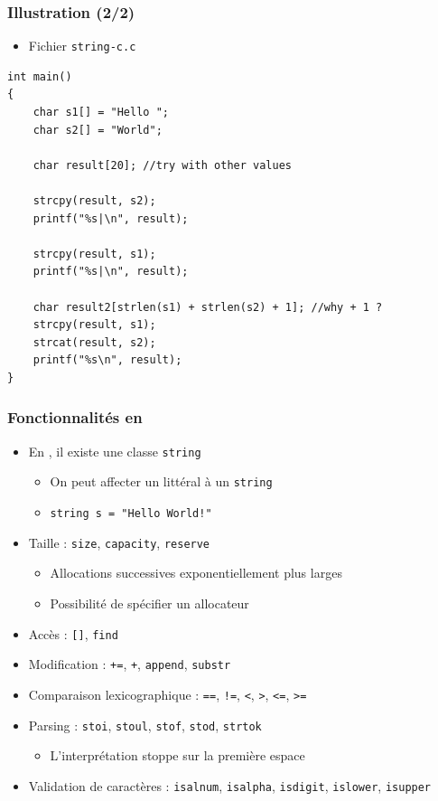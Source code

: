 \begin{frame}[containsverbatim]
\frametitle{Illustration (2/2)}
\begin{itemize}
\item Fichier \texttt{string-c.c}
\end{itemize}
\begin{lstlisting}
int main()
{
	char s1[] = "Hello ";
	char s2[] = "World";

	char result[20]; //try with other values

	strcpy(result, s2);	
	printf("%s|\n", result);

	strcpy(result, s1);
	printf("%s|\n", result);

	char result2[strlen(s1) + strlen(s2) + 1]; //why + 1 ?
	strcpy(result, s1);
	strcat(result, s2);
	printf("%s\n", result);	
}
\end{lstlisting}
\end{frame}

\begin{frame}
\frametitle{Fonctionnalités en \cpp}
\begin{itemize}[<+->]
\item En \cpp, il existe une classe \texttt{string}
	\begin{itemize}
	\item On peut affecter un littéral à un \texttt{string}
	\item \lstinline|string s = "Hello World!"|
	\end{itemize}
\item Taille : \texttt{size}, \texttt{capacity}, \texttt{reserve}
	\begin{itemize}
	\item Allocations successives exponentiellement plus larges
	\item Possibilité de spécifier un allocateur
	\end{itemize}
\item Accès : \texttt{[]}, \texttt{find}
\item Modification : \texttt{+=}, \texttt{+}, \texttt{append}, \texttt{substr}
\item Comparaison lexicographique : \texttt{==}, \texttt{!=}, \texttt{<}, \texttt{>}, \texttt{<=}, \texttt{>=}
\item Parsing : \texttt{stoi}, \texttt{stoul}, \texttt{stof}, \texttt{stod}, \texttt{strtok}
	\begin{itemize}
	\item L'interprétation stoppe sur la première espace
	\end{itemize}
\item Validation de caractères : \texttt{isalnum}, \texttt{isalpha}, \texttt{isdigit}, \texttt{islower}, \texttt{isupper}
\end{itemize}
\end{frame}

